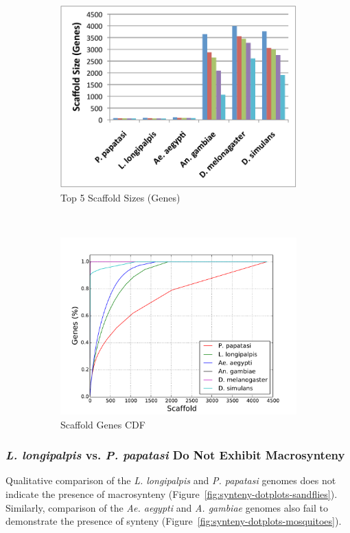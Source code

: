 \begin{figure}[H]
\begin{subfigure}[b]{0.45\textwidth}
    \includegraphics[width=\textwidth]{figures/synteny/top5_scaffold_sizes.pdf}
    \caption{Top 5 Scaffold Sizes (Genes)}
  \end{subfigure}
  ~
  \begin{subfigure}[b]{0.45\textwidth}
    \includegraphics[width=\textwidth]{figures/synteny/gene_scaffold_cdf.pdf}
    \caption{Scaffold Genes CDF}
  \end{subfigure}
  \label{fig:scaffolds}
  \caption{}
\end{figure}

\subsubsection{\emph{L. longipalpis} vs. \emph{P. papatasi} Do Not Exhibit Macrosynteny}
Qualitative comparison of the \emph{L. longipalpis} and \emph{P. papatasi} genomes does not indicate the presence of macrosynteny (Figure~\ref{fig:synteny-dotplots-sandflies}).  Similarly, comparison of the \emph{Ae. aegypti} and \emph{A. gambiae} genomes also fail to demonstrate the presence of synteny (Figure~\ref{fig:synteny-dotplots-mosquitoes}).

